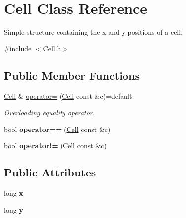 \hypertarget{struct_cell}{}\section{Cell Class Reference}
\label{struct_cell}


Simple structure containing the x and y positions of a cell.  




{\ttfamily \#include $<$Cell.\+h$>$}

\subsection*{Public Member Functions}
\begin{DoxyCompactItemize}
\item 
\hyperlink{struct_cell}{Cell} \& \hyperlink{struct_cell_ac1f905d4cd626cc32963ab7a6f76634e}{operator=} (\hyperlink{struct_cell}{Cell} const \&c)=default
\begin{DoxyCompactList}\small\item\em Overloading equality operator. \end{DoxyCompactList}\item 
bool {\bfseries operator==} (\hyperlink{struct_cell}{Cell} const \&c)\hypertarget{struct_cell_abd251051519de0c0b3f2cdace1a2c684}{}\label{struct_cell_abd251051519de0c0b3f2cdace1a2c684}

\item 
bool {\bfseries operator!=} (\hyperlink{struct_cell}{Cell} const \&c)\hypertarget{struct_cell_ac3b83bb33eb11dd036a4acecc7fa62d0}{}\label{struct_cell_ac3b83bb33eb11dd036a4acecc7fa62d0}

\end{DoxyCompactItemize}
\subsection*{Public Attributes}
\begin{DoxyCompactItemize}
\item 
long {\bfseries x}\hypertarget{struct_cell_a20ccaf4c7a18ce06930f961ed4fe3851}{}\label{struct_cell_a20ccaf4c7a18ce06930f961ed4fe3851}

\item 
long {\bfseries y}\hypertarget{struct_cell_a05aaf17f035c254584190b8ada505efc}{}\label{struct_cell_a05aaf17f035c254584190b8ada505efc}

\end{DoxyCompactItemize}



